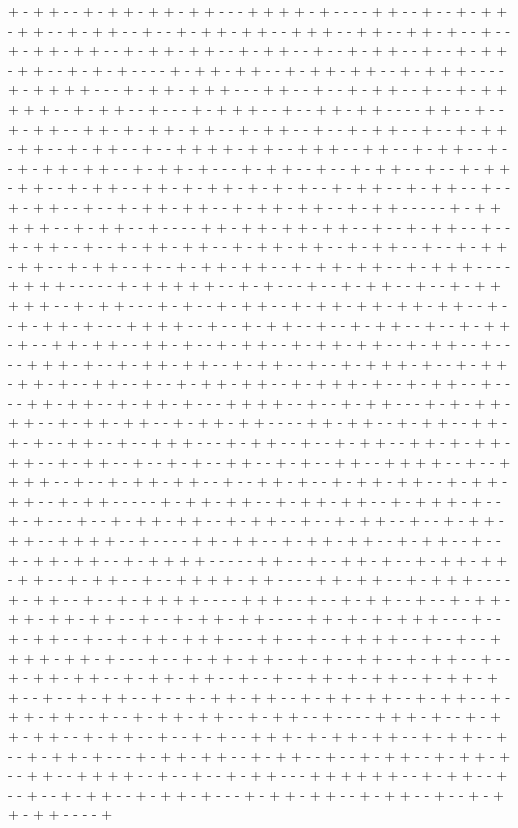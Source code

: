 + - + + - - + - + + - + + - + + - - - + + + + - + - - - - + + - - + - - + - + + - + + - - + - + + - - + - - + - + + - + + - - + + + - - + + - - + + - + - - + - - + - + + - + + - - + - + + - + + - - + - + + - - + - - + - + + - - + - - + - + + - + + - - + - + - + - - - - + - + + - + + - - + - + + - + + - - + - + + + - - - - + - + + + + - - - + - + + - + + + - - - + + - - + - - + - + + - - + - - + - + + + + + - - + - + + - - + - - - + - + + + - - + - - + + - + + - - - - + + - - + - - + - + + - - + + - + - + + - + + - - + - + + - - + - - + - + + - - + - - + - + + - + + - - + - + + - - + - - + + + + - + + - - + + + - - + + - - + - + + - - + - - + - + + - + + - - + - + + - + - - - + - + + - - + - - + - + + - - + - - + - + + - + + - - + - + + - - + + - + - + + - + - + - + - - + - + + - - + - + + - - + - - + - + + - - + - - + - + + - + + - - + - + + - + + - - + - + + - - - - - + - + + + + + - - + - + + - - + - - - - + + - + + - + + - + + - - + - - + - + + - - + - - + - + + - - + - - + - + + - + + - - + - + + - + + - - + - + + - - + - - + - + + - + + - - + - + + - - + - - + - + + - + + - - + - + + - + + - - + - + + + - - - - + + + + - - - - - + - + + + + + - - + - + - - - + - - + - + + - - + - - + - + + + + + - - + - + + - - - + - + - - + - + + - - + - + + - + + - + + - + + - - + - - + - + + - + - - - + + + + - - + - - + - + + - - + - - + - + + - - + - - + - + + - + - - + + - + + - - + + - + - - + - + + - - + - + + - + + - - + - + + - - + - - - - + + + - + - - + - + + - + + - - + - + + - - + - - + - + + + - + - - + - + + - + + - + - - + + - - + - - + - + + - + + - - + - + + + - + - - + - + + - - + - - - - + + - + + - - + - + + - + - - - + + + + - - + - - + - + + - - - + - + - + + - + + - - + - + + - + + - - + - + + - + + - - - - + + - + + - - + - + + - - + + - + - + - - + + - - + - - + + + - - - + - + + - - + - - + - + + - - + + - + - + + - + + - - + - + + - - + - - + - + - - + + - - + - + - - + + - - + + + + - - + - - + + + + - - + - - + - + + - + + - - + - - + + - + - - + - + + - + + - - + - + + - + + - - + - + + - - - - - + - + + - + + - - + - + + - + + - - + - + + + - + - - + - + - - - + - - + - + + - + + - - + - + + - - + - - + - + + - - + - - + - + + - + + - - + + + + - - + - - - - + + - + + - - + - + + - + + - - + - + + - - + - - + - + + - + + - - + - + + + + - - - - - + + - - + - - + + - + - - + - + + - + + - + + - - + - + + - - + - - + + + + - + + - - - - + + - + + - - + - + + + - - - - + - + + - - + - - + - + + + + - - - - + + + - - + - - + - + + - - + - - + - + + - + + - + + - + + - - + - - + - + + - + + - - - - + + - + - + - + + + - - - + - - + - + + - - + - - + - + + - + + + - - - + + - - + - - + + + + - - + - - + - - + + + + - + + - + - - - + - - + - + + - + + - - + - + - - + + - - + - + + - - + - - + - + + - + + - - + - + + - + + - - + - - + - - + + - + - + + - - + - + + - + + - - + - - + - + + - - + - - + - + + - + + - - + - + + - + + - - + - + + - - + - + + - + + - - + - - + - + + - + + - - + - + + - - + - - - - + + + - + - - + - + + - + + - - + - + + - - + - - + - + - - + + + - + - + + - + + - - + - + + - - + - - + - + + - + - - - + - + + - + + - - + - + + - - + - - + - + + - - + - + + - + - - + + - - + + + + - - + - - + - - + - + + - - - + + + + + + - - + - + + - - + - - + - - + - + + - - + - + + - + - - - + - + + - + + - - + - + + - - + - - + - + + - + + - - - - + 